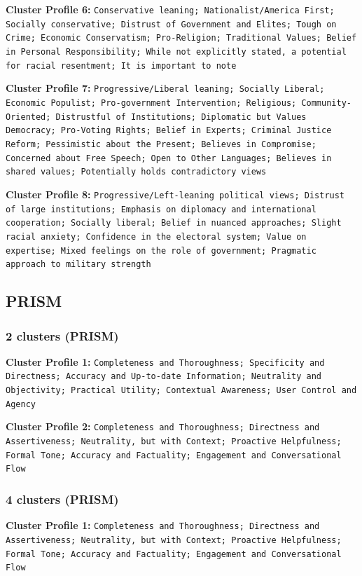 \documentclass[11pt]{article}
\begin{document}
\textbf{Cluster Profile 6:} \texttt{Conservative leaning; Nationalist/America First; Socially conservative; Distrust of Government and Elites; Tough on Crime; Economic Conservatism; Pro-Religion; Traditional Values; Belief in Personal Responsibility; While not explicitly stated, a potential for racial resentment; It is important to note}

\textbf{Cluster Profile 7:} \texttt{Progressive/Liberal leaning; Socially Liberal; Economic Populist; Pro-government Intervention; Religious; Community-Oriented; Distrustful of Institutions; Diplomatic but Values Democracy; Pro-Voting Rights; Belief in Experts; Criminal Justice Reform; Pessimistic about the Present; Believes in Compromise; Concerned about Free Speech; Open to Other Languages; Believes in shared values; Potentially holds contradictory views}

\textbf{Cluster Profile 8:} \texttt{Progressive/Left-leaning political views; Distrust of large institutions; Emphasis on diplomacy and international cooperation; Socially liberal; Belief in nuanced approaches; Slight racial anxiety; Confidence in the electoral system; Value on expertise; Mixed feelings on the role of government; Pragmatic approach to military strength}


\subsection{PRISM}

\subsubsection{2 clusters (PRISM)}

\textbf{Cluster Profile 1:} \texttt{Completeness and Thoroughness; Specificity and Directness; Accuracy and Up-to-date Information; Neutrality and Objectivity; Practical Utility; Contextual Awareness; User Control and Agency}

\textbf{Cluster Profile 2:} \texttt{Completeness and Thoroughness; Directness and Assertiveness; Neutrality, but with Context; Proactive Helpfulness; Formal Tone; Accuracy and Factuality; Engagement and Conversational Flow}

\subsubsection{4 clusters (PRISM)}

\textbf{Cluster Profile 1:} \texttt{Completeness and Thoroughness; Directness and Assertiveness; Neutrality, but with Context; Proactive Helpfulness; Formal Tone; Accuracy and Factuality; Engagement and Conversational Flow}
\end{document}
